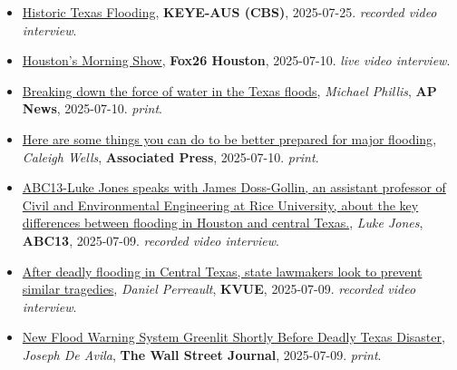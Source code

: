 \documentclass[10pt,oneside]{article}
\begin{document}
\mbox{}\vspace{-\dimexpr\baselineskip\relax}

\begin{itemize}[label={}]

  \item \href{https://mms.tveyes.com/Transcript.asp?StationID=2370&DateTime=7%2F25%2F2025+6%3A31%3A37+PM&LineNumber=&MediaStationID=2370&playclip=True&RefPage=&pbc=WatchlistTerm%3A1599598}{Historic Texas Flooding}, \textbf{KEYE-AUS (CBS)}, 2025-07-25.
        \textsl{recorded video interview}.

  \item \href{https://mms.tveyes.com/Transcript.asp?StationID=979&DateTime=7%2F10%2F2025+8%3A31%3A51+AM&LineNumber=&MediaStationID=979&playclip=True&RefPage=&pbc=WatchlistTerm%3A1599598}{Houston's Morning Show}, \textbf{Fox26 Houston}, 2025-07-10.
        \textsl{live video interview}.

  \item \href{https://apnews.com/article/flash-floods-texas-hill-country-hydrology-51901309407b21b65cbbc6c04206f627}{Breaking down the force of water in the Texas floods}, \textit{Michael Phillis}, \textbf{AP News}, 2025-07-10.
        \textsl{print}.

  \item \href{https://apnews.com/article/flood-hurricane-emergency-disaster-prepare-abb8f9cc9ab16c89a3937638739c6663}{Here are some things you can do to be better prepared for major flooding}, \textit{Caleigh Wells}, \textbf{Associated Press}, 2025-07-10.
        \textsl{print}.

  \item \href{https://www.facebook.com/watch/?v=1931096184096338}{ABC13-Luke Jones speaks with James Doss-Gollin, an assistant professor of Civil and Environmental Engineering at Rice University, about the key differences between flooding in Houston and central Texas.}, \textit{Luke Jones}, \textbf{ABC13}, 2025-07-09.
        \textsl{recorded video interview}.

  \item \href{https://www.kvue.com/article/news/politics/special-session/central-texas-flooding-special-session/269-2e5a87d4-ec92-4fb8-b850-748de1a6cbbe}{After deadly flooding in Central Texas, state lawmakers look to prevent similar tragedies}, \textit{Daniel Perreault}, \textbf{KVUE}, 2025-07-09.
        \textsl{recorded video interview}.

  \item \href{https://www.wsj.com/us-news/climate-environment/texas-guadalupe-flood-threat-system-06c29954}{New Flood Warning System Greenlit Shortly Before Deadly Texas Disaster}, \textit{Joseph De Avila}, \textbf{The Wall Street Journal}, 2025-07-09.
        \textsl{print}.


\end{itemize}
\end{document}
